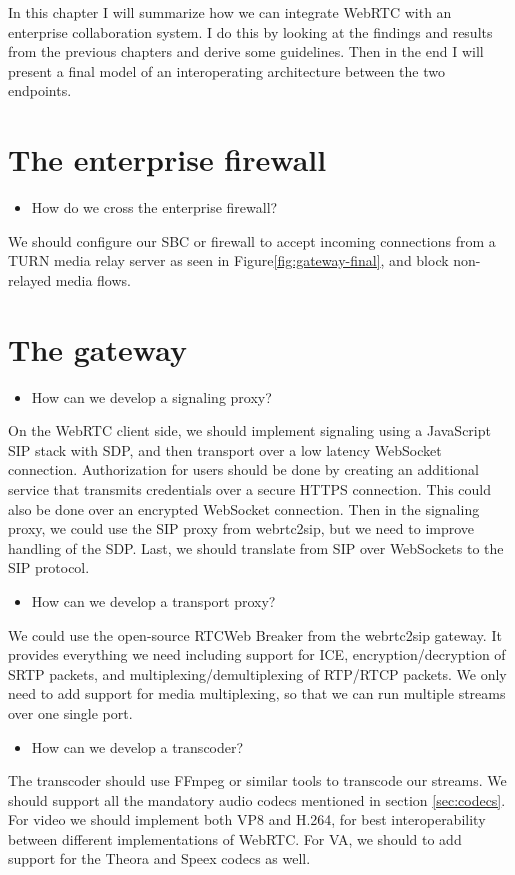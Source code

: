 In this chapter I will summarize how we can integrate WebRTC with an enterprise collaboration system. I do this by looking at the findings and results from the previous chapters and derive some guidelines. Then in the end I will present a final model of an interoperating architecture between the two endpoints.

\section{The enterprise firewall}

\begin{itemize}
\item How do we cross the enterprise firewall?
\end{itemize}
We should configure our SBC or firewall to accept incoming connections from a TURN media relay server as seen in Figure\ref{fig:gateway-final}, and block non-relayed media flows.

\section{The gateway}

\begin{itemize}
\item How can we develop a signaling proxy?
\end{itemize}
On the WebRTC client side, we should implement signaling using a JavaScript SIP stack with SDP, and then transport over a low latency WebSocket connection. Authorization for users should be done by creating an additional service that transmits credentials over a secure HTTPS connection. This could also be done over an encrypted WebSocket connection. Then in the signaling proxy, we could use the SIP proxy from webrtc2sip, but we need to improve handling of the SDP. Last, we should translate from SIP over WebSockets to the SIP protocol.

\begin{itemize}
\item How can we develop a transport proxy?
\end{itemize}
We could use the open-source RTCWeb Breaker from the webrtc2sip gateway. It provides everything we need including support for ICE, encryption/decryption of SRTP packets, and multiplexing/demultiplexing of RTP/RTCP packets. We only need to add support for media multiplexing, so that we can run multiple streams over one single port.

\begin{itemize}
\item How can we develop a transcoder?
\end{itemize}
The transcoder should use FFmpeg or similar tools to transcode our streams. We should support all the mandatory audio codecs mentioned in section \ref{sec:codecs}. For video we should implement both VP8 and H.264, for best interoperability between different implementations of WebRTC. For VA, we should to add support for the Theora and Speex codecs as well.

